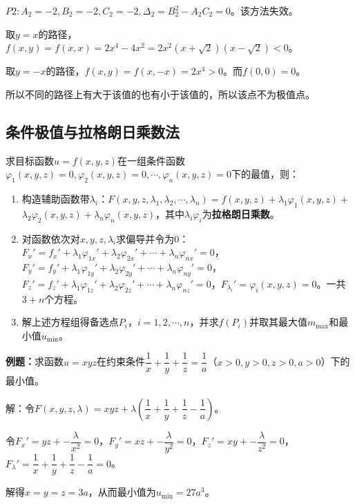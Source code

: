 \documentclass[UTF8, 12pt]{ctexart}
\begin{document}
$P2:A_2=-2,B_2=-2,C_2=-2,\Delta_2=B_2^2-A_2C_2=0$。该方法失效。

取$y=x$的路径，$f(x,y)=f(x,x)=2x^4-4x^2=2x^2(x+\sqrt{2})(x-\sqrt{2})<0$。

取$y=-x$的路径，$f(x,y)=f(x,-x)=2x^4>0$。而$f(0,0)=0$。

所以不同的路径上有大于该值的也有小于该值的，所以该点不为极值点。



\subsection{条件极值与拉格朗日乘数法}

求目标函数$u=f(x,y,z)$在一组条件函数$\varphi_1(x,y,z)=0,\varphi_2(x,y,z)=0,\cdots,\varphi_n(x,y,z)=0$下的最值，则：

\begin{enumerate}
    \item 构造辅助函数带$\lambda_i$：$F(x,y,z,\lambda_1,\lambda_2,\cdots,\lambda_n)=f(x,y,z)+\lambda_1\varphi_1(x,y,z)+$\\$\lambda_2\varphi_2(x,y,z)+\lambda_n\varphi_n(x,y,z)$，其中$\lambda_i\varphi_i$为\textbf{拉格朗日乘数}。
    \item 对函数依次对$x,y,z,\lambda_i$求偏导并令为0：$F_x'=f_x'+\lambda_1\varphi_{1x}'+\lambda_2\varphi_{2x}'+\cdots+\lambda_n\varphi_{nx}'=0$，$F_y'=f_y'+\lambda_1\varphi_{1y}'+\lambda_2\varphi_{2y}'+\cdots+\lambda_n\varphi_{ny}'=0$，$F_z'=f_z'+\lambda_1\varphi_{1z}'+\lambda_2\varphi_{2z}'+\cdots+\lambda_n\varphi_{nz}'=0$，$F_{\lambda_i}'=\varphi_i(x,y,z)=0$。一共$3+n$个方程。
    \item 解上述方程组得备选点$P_i$，$i=1,2,\cdots,n$，并求$f(P_i)$并取其最大值$m_{\max}$和最小值$u_{\min}$。
\end{enumerate}

\textbf{例题：}求函数$u=xyz$在约束条件$\dfrac{1}{x}+\dfrac{1}{y}+\dfrac{1}{z}=\dfrac{1}{a}$（$x>0,y>0,z>0,a>0$）下的最小值。

解：令$F(x,y,z,\lambda)=xyz+\lambda\left(\dfrac{1}{x}+\dfrac{1}{y}+\dfrac{1}{z}-\dfrac{1}{a}\right)$。

令$F_x'=yz+-\dfrac{\lambda}{x^2}=0$，$F_y'=xz+-\dfrac{\lambda}{y^2}=0$，$F_z'=xy+-\dfrac{\lambda}{z^2}=0$，$F_\lambda'=\dfrac{1}{x}+\dfrac{1}{y}+\dfrac{1}{z}-\dfrac{1}{a}=0$。

解得$x=y=z=3a$，从而最小值为$u_{\min}=27a^3$。


\end{document}
